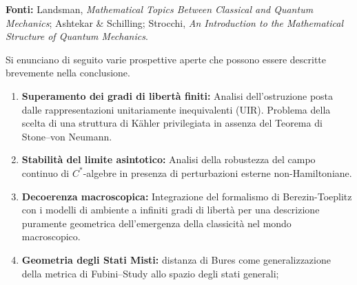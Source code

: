 \documentclass[12pt, a4paper]{article}
\newcommand{\fonti}[1]{%
	\begin{fontebox}
		\textcolor{fontecolor}{\footnotesize\textbf{Fonti:} #1}
	\end{fontebox}%
}
\begin{document}
	\fonti{Landsman, \textit{Mathematical Topics Between Classical and Quantum Mechanics}; Ashtekar \& Schilling; Strocchi, \textit{An Introduction to the Mathematical Structure of Quantum Mechanics}.}
	
	Si enunciano di seguito varie prospettive aperte che possono essere descritte brevemente nella conclusione.
	
	\begin{enumerate}
		\item \textbf{Superamento dei gradi di libertà finiti:} Analisi dell'ostruzione posta dalle rappresentazioni unitariamente inequivalenti (UIR). Problema della scelta di una struttura di Kähler privilegiata in assenza del Teorema di Stone--von Neumann.
		
		\item \textbf{Stabilità del limite asintotico:} Analisi della robustezza del campo continuo di $C^*$-algebre in presenza di perturbazioni esterne non-Hamiltoniane.
		
		\item \textbf{Decoerenza macroscopica:} Integrazione del formalismo di Berezin-Toeplitz con i modelli di ambiente a infiniti gradi di libertà per una descrizione puramente geometrica dell'emergenza della classicità nel mondo macroscopico.
		
		\item \textbf{Geometria degli Stati Misti:} distanza di Bures come generalizzazione della metrica di Fubini–Study allo spazio degli stati generali;
	\end{enumerate}
	
\end{document}
